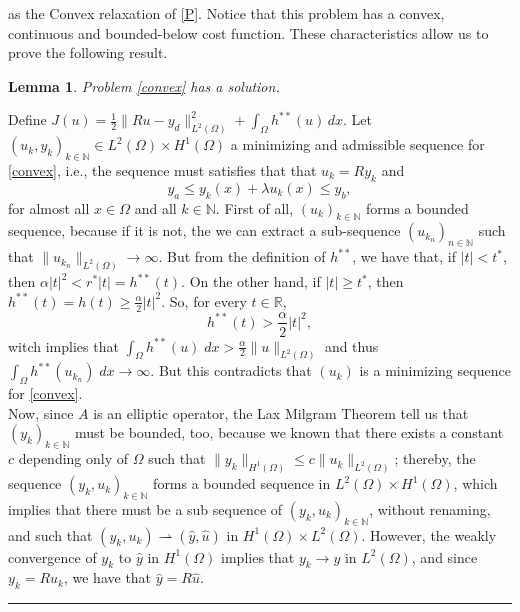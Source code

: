 \documentclass[11pt,a4paper]{amsart}
\newcommand{\kw}{\rule{2mm}{2mm}}
\renewenvironment{proof}{{Proof.}}{\hfill\kw}
\newtheorem{lemma}{{Lemma}}
\newcommand{\norm}[1]{\lVert #1 \rVert}
\begin{document}
   as the Convex relaxation of \eqref{P}. Notice that this problem has a convex, continuous and bounded-below cost function. These characteristics allow us to prove the following result.
   \begin{lemma}
       Problem \eqref{convex} has a solution.
   \end{lemma}
   \begin{proof}
       Define $J(u)=\frac{1}{2}\norm{Ru-y_d}_{L^2(\Omega)}^2+ \int_{\Omega}h^{**}(u)\, dx$. Let $(u_k,y_k)_{k\in \mathbb{N}}\in L^2(\Omega)\times H^1(\Omega)$ a minimizing and admissible sequence for \eqref{convex}, i.e., the sequence must satisfies that that $u_k=Ry_k$ and 
    \[
    y_a\le y_k(x)+\lambda u_{k}(x)\le y_b,
    \]
    for almost all $x\in \Omega$ and all $k\in \mathbb{N}$. First of all, $(u_k)_{k\in \mathbb{N}}$ forms a bounded sequence, because if it is not, the we can extract a sub-sequence $(u_{k_n})_{n\in \mathbb{N}}$ such that $\norm{u_{k_n}}_{L^2(\Omega)}\to \infty$. But from the definition of $h^{**}$, we have that, if $|t|<t^*$, then $\alpha |t|^2<r^*|t|=h^{**}(t)$. On the other hand, if $|t|\ge t^*$, then $h^{**}(t)=h(t)\ge \frac{\alpha}{2}|t|^2$. So, for every $t\in \mathbb{R}$,
       \[
       h^{**}(t)>\frac{\alpha}{2}|t|^2,
       \]
       witch implies that $\int_{\Omega}h^{**}(u)\; dx>\frac{\alpha}{2}\norm{u}_{L^2(\Omega)}$ and thus $\int_{\Omega}h^{**}(u_{k_n})\; dx\to \infty$. But this contradicts that $(u_k)$ is a minimizing sequence for \eqref{convex}.\\
       
       Now, since $A$ is an elliptic operator, the  Lax Milgram Theorem tell us that $(y_{k})_{k\in \mathbb{N}}$ must be bounded, too, because we known that there exists a constant $c$ depending only of $\Omega$ such that $\norm{y_k}_{H^1(\Omega)}\le c\norm{u_k}_{L^2(\Omega)}$; thereby, the sequence $(y_k,u_k)_{k\in\mathbb{N}}$ forms a bounded sequence in $L^2(\Omega)\times H^1(\Omega)$,  which implies that there must be a sub sequence of $(y_k,u_k)_{k\in\mathbb{N}}$, without renaming, and such that $(y_{k},u_{k})\rightharpoonup (\hat{y},\hat{u})$ in $H^1(\Omega)\times L^2(\Omega)$. However, the weakly convergence of $y_k$ to $\hat{y}$ in $H^1(\Omega)$ implies that $y_{k}\to y$ in $L^2(\Omega)$, and since $y_{k}=Ru_k$, we have that $\hat{y}=R\hat{u}$.\\   


\end{proof}
\end{document}

